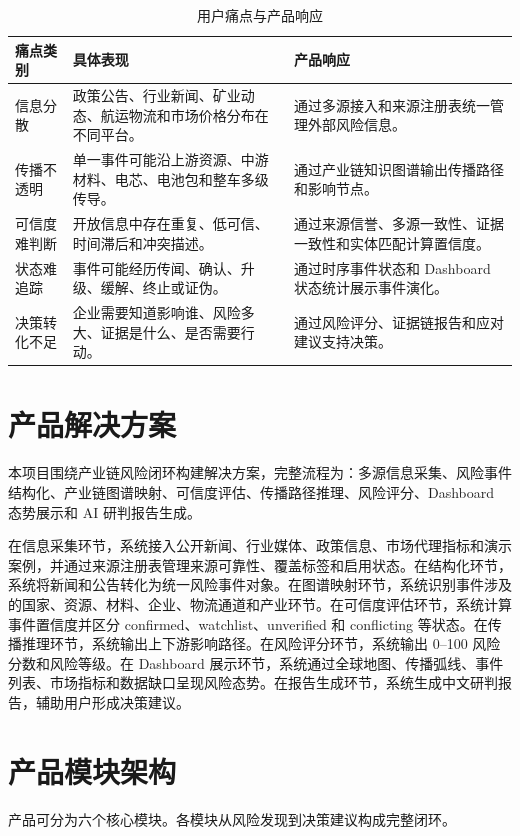 \documentclass[12pt,a4paper]{ctexart}
\begin{document}
\begin{table}[htbp]
\centering
\caption{用户痛点与产品响应}
\begin{tabularx}{\textwidth}{p{3.0cm}p{5.2cm}X}
\toprule
痛点类别 & 具体表现 & 产品响应 \\
\midrule
信息分散 & 政策公告、行业新闻、矿业动态、航运物流和市场价格分布在不同平台。 & 通过多源接入和来源注册表统一管理外部风险信息。 \\
传播不透明 & 单一事件可能沿上游资源、中游材料、电芯、电池包和整车多级传导。 & 通过产业链知识图谱输出传播路径和影响节点。 \\
可信度难判断 & 开放信息中存在重复、低可信、时间滞后和冲突描述。 & 通过来源信誉、多源一致性、证据一致性和实体匹配计算置信度。 \\
状态难追踪 & 事件可能经历传闻、确认、升级、缓解、终止或证伪。 & 通过时序事件状态和 Dashboard 状态统计展示事件演化。 \\
决策转化不足 & 企业需要知道影响谁、风险多大、证据是什么、是否需要行动。 & 通过风险评分、证据链报告和应对建议支持决策。 \\
\bottomrule
\end{tabularx}
\end{table}

\section{产品解决方案}

本项目围绕产业链风险闭环构建解决方案，完整流程为：多源信息采集、风险事件结构化、产业链图谱映射、可信度评估、传播路径推理、风险评分、Dashboard 态势展示和 AI 研判报告生成。

在信息采集环节，系统接入公开新闻、行业媒体、政策信息、市场代理指标和演示案例，并通过来源注册表管理来源可靠性、覆盖标签和启用状态。在结构化环节，系统将新闻和公告转化为统一风险事件对象。在图谱映射环节，系统识别事件涉及的国家、资源、材料、企业、物流通道和产业环节。在可信度评估环节，系统计算事件置信度并区分 confirmed、watchlist、unverified 和 conflicting 等状态。在传播推理环节，系统输出上下游影响路径。在风险评分环节，系统输出 0--100 风险分数和风险等级。在 Dashboard 展示环节，系统通过全球地图、传播弧线、事件列表、市场指标和数据缺口呈现风险态势。在报告生成环节，系统生成中文研判报告，辅助用户形成决策建议。

\section{产品模块架构}

产品可分为六个核心模块。各模块从风险发现到决策建议构成完整闭环。
\end{document}
